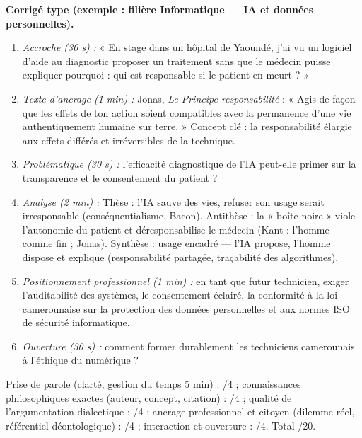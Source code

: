 \documentclass[11pt]{article}
\newcommand{\cle}[1]{{\popxbold\color{popdark}#1}}
\begin{document}
\begin{corrige}
\textbf{Corrigé type (exemple : filière Informatique — IA et données personnelles).}
\begin{enumerate}
    \item \emph{Accroche (30 s) :} « En stage dans un hôpital de Yaoundé, j'ai vu un logiciel d'aide au diagnostic proposer un traitement sans que le médecin puisse expliquer pourquoi : qui est responsable si le patient en meurt ? »
    \item \emph{Texte d'ancrage (1 min) :} Jonas, \emph{Le Principe responsabilité} : « Agis de façon que les effets de ton action soient compatibles avec la permanence d'une vie authentiquement humaine sur terre. » Concept clé : la \cle{responsabilité} élargie aux effets différés et irréversibles de la technique.
    \item \emph{Problématique (30 s) :} l'efficacité diagnostique de l'IA peut-elle primer sur la transparence et le consentement du patient ?
    \item \emph{Analyse (2 min) :} Thèse : l'IA sauve des vies, refuser son usage serait irresponsable (conséquentialisme, Bacon). Antithèse : la « boîte noire » viole l'autonomie du patient et déresponsabilise le médecin (Kant : l'homme comme fin ; Jonas). Synthèse : usage encadré — l'IA propose, l'homme dispose et explique (responsabilité partagée, traçabilité des algorithmes).
    \item \emph{Positionnement professionnel (1 min) :} en tant que futur technicien, exiger l'auditabilité des systèmes, le consentement éclairé, la conformité à la loi camerounaise sur la protection des données personnelles et aux normes ISO de sécurité informatique.
    \item \emph{Ouverture (30 s) :} comment former durablement les techniciens camerounais à l'éthique du numérique ?
\end{enumerate}
\end{corrige}

\begin{methode}
Prise de parole (clarté, gestion du temps 5 min) : /4 ; connaissances philosophiques exactes (auteur, concept, citation) : /4 ; qualité de l'argumentation dialectique : /4 ; ancrage professionnel et citoyen (dilemme réel, référentiel déontologique) : /4 ; interaction et ouverture : /4. Total /20.
\end{methode}
\end{document}
